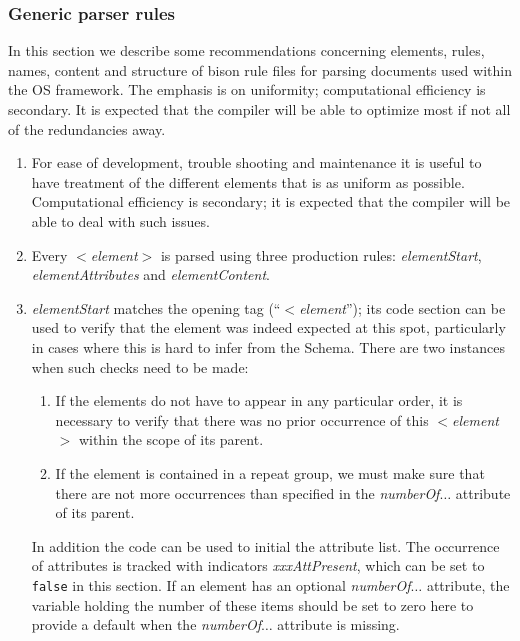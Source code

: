 \subsubsection{Generic parser rules}\label{section:ParserRules}

In this section we describe some recommendations concerning elements, rules, names, 
content and structure of bison rule files for parsing documents used within the OS framework. 
The emphasis is on uniformity; computational efficiency is secondary. It is expected that the compiler will be able to optimize most if not all of the redundancies away.

\begin{enumerate}

\item    
For ease of development, trouble shooting and maintenance it is useful to have treatment of the 
different elements that is as uniform as possible. Computational efficiency is secondary; it is expected 
that the compiler will be able to deal with such issues. 

\item \label{enum:element}
	Every $<${\it element}$>$ is parsed using three production rules: {\it  elementStart\/}, {\it elementAttributes\/} 
and {\it elementContent\/}. 

\item
	{\it elementStart\/} matches the opening tag (``$<${\it element\/}''); its code section can be used 
to verify that the element was indeed expected at this spot, particularly in cases where this is hard 
to infer from the Schema. There are two instances when such checks need to be made:

\begin{enumerate}
\item	If the elements do not have to appear in any particular order, 
it is necessary to verify that there was no prior occurrence of this $<${\it element}$>$ within the scope 
of its parent.
\item If the element is contained in a repeat group, we must make sure that there are not 
more occurrences than specified in the {\it numberOf}$\ldots$ attribute of its parent.
\end{enumerate}
In addition the code can be used to initial the attribute list. The occurrence of attributes is tracked 
with indicators {\it xxxAttPresent}, which can be set to {\tt false} in this section. If an element 
has an optional {\it numberOf}$\ldots$ attribute, the variable holding the number of these items 
should be set to zero here to provide a default when the {\it numberOf}$\ldots$ attribute is missing.


\end{enumerate}
